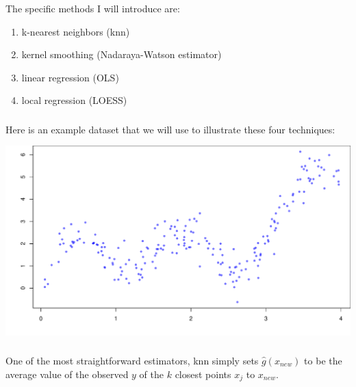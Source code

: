 \documentclass[xetex,mathserif,serif,aspectratio=169]{beamer}
\begin{document}
\begin{frame}[fragile] \frametitle{} \oldB \small

The specific methods I will introduce are:

\begin{enumerate}
\item k-nearest neighbors (knn)
\item kernel smoothing (Nadaraya-Watson estimator)
\item linear regression (OLS)
\item local regression (LOESS)
\end{enumerate}

\end{frame}

\begin{frame}[fragile] \frametitle{} \oldB \small

Here is an example dataset that we will use to illustrate these
four techniques:
\begin{center}
\includegraphics[width=\textwidth]{img/scatter.pdf}
\end{center}

\end{frame}

\begin{frame}[fragile] \frametitle{} \oldB \small


One of the most straightforward estimators, knn simply sets $\widehat{g}(x_{new})$ to be
the average value of the observed $y$ of the $k$ closest points $x_j$ to $x_{new}$.

\end{frame}
\end{document}
